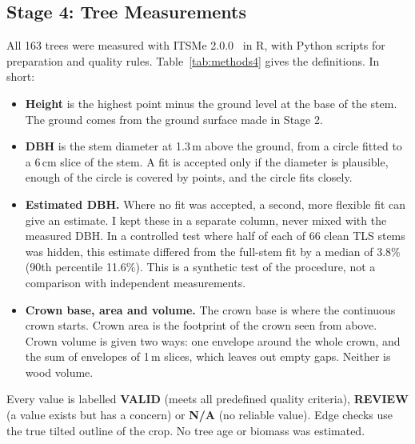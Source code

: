 \documentclass[runningheads]{llncs}
\begin{document}
\subsection{Stage 4: Tree Measurements}\label{sec:attr}
All 163 trees were measured with ITSMe 2.0.0~\cite{terryn2023} in R, with Python scripts for preparation and quality rules. Table~\ref{tab:methods4} gives the definitions. In short:
\begin{itemize}
\item \textbf{Height} is the highest point minus the ground level at the base of the stem. The ground comes from the ground surface made in Stage 2.
\item \textbf{DBH} is the stem diameter at 1.3\,m above the ground, from a circle fitted to a 6\,cm slice of the stem. A fit is accepted only if the diameter is plausible, enough of the circle is covered by points, and the circle fits closely.
\item \textbf{Estimated DBH.} Where no fit was accepted, a second, more flexible fit can give an estimate. I kept these in a separate column, never mixed with the measured DBH. In a controlled test where half of each of 66 clean TLS stems was hidden, this estimate differed from the full-stem fit by a median of 3.8\% (90th percentile 11.6\%). This is a synthetic test of the procedure, not a comparison with independent measurements.
\item \textbf{Crown base, area and volume.} The crown base is where the continuous crown starts. Crown area is the footprint of the crown seen from above. Crown volume is given two ways: one envelope around the whole crown, and the sum of envelopes of 1\,m slices, which leaves out empty gaps. Neither is wood volume.
\end{itemize}
Every value is labelled \textbf{VALID} (meets all predefined quality criteria), \textbf{REVIEW} (a value exists but has a concern) or \textbf{N/A} (no reliable value). Edge checks use the true tilted outline of the crop. No tree age or biomass was estimated.
\end{document}
